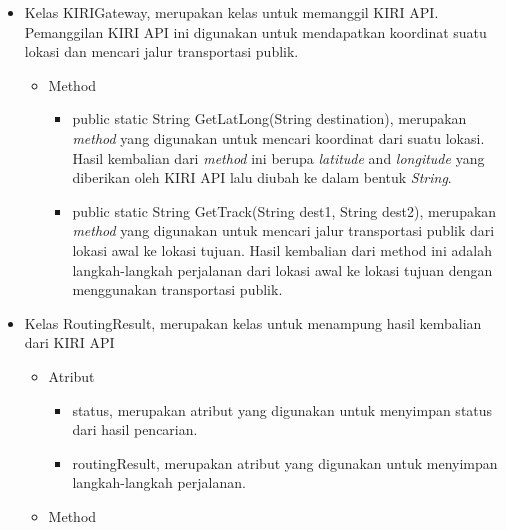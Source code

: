 \begin{itemize}
		\item Kelas KIRIGateway, merupakan kelas untuk memanggil KIRI API. Pemanggilan KIRI API ini digunakan untuk mendapatkan koordinat suatu lokasi dan mencari jalur transportasi publik.
		
		
				\begin{itemize}
							\item Method
							
							
									\begin{itemize}
												\item public static String GetLatLong(String destination), merupakan \textit{method} yang digunakan untuk mencari koordinat dari suatu lokasi. Hasil kembalian dari \textit{method} ini berupa \textit{latitude} and \textit{longitude} yang diberikan oleh KIRI API lalu diubah ke dalam bentuk \textit{String}.
												\item public static String GetTrack(String dest1, String dest2), merupakan \textit{method} yang digunakan untuk mencari jalur transportasi publik dari lokasi awal ke lokasi tujuan. Hasil kembalian dari method ini adalah langkah-langkah perjalanan dari lokasi awal ke lokasi tujuan dengan menggunakan transportasi publik.
									\end{itemize}
				\end{itemize}
		
		
		\item Kelas RoutingResult, merupakan kelas untuk menampung hasil kembalian dari KIRI API
		
		
				\begin{itemize}
							\item Atribut
					
					
									\begin{itemize}
												\item status, merupakan atribut yang digunakan untuk menyimpan status dari hasil pencarian.
												\item routingResult, merupakan atribut yang digunakan untuk menyimpan langkah-langkah perjalanan.
									\end{itemize}
					
							\item Method
					

\end{itemize}
\end{itemize}
